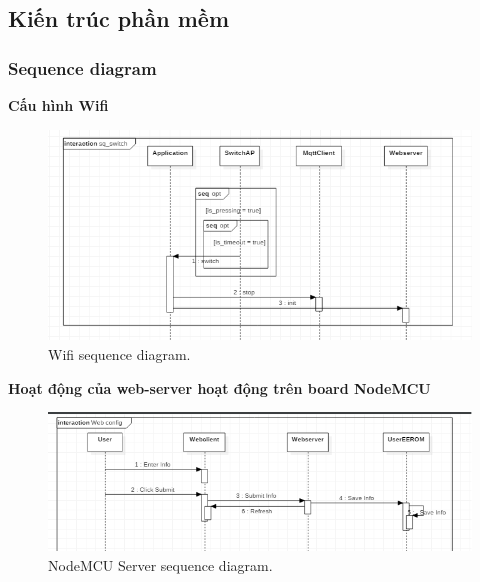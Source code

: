 \documentclass[a4paper,12pt,oneside]{article}
\begin{document}


\newpage
\subsection{Kiến trúc phần mềm}
\subsubsection{Sequence diagram}
\noindent \textbf{Cấu hình Wifi}
\begin{figure}[H]
\centering
\begin{center}
\includegraphics[scale=.9]{hinh/sq_switch_wifi.PNG}
\end{center}
\caption{Wifi sequence diagram.}
\end{figure}

\noindent \textbf{Hoạt động của web-server hoạt động trên board NodeMCU}
\begin{figure}[H]
\centering
\begin{center}
\includegraphics[scale=.8]{hinh/sq_web.PNG}
\end{center}
\caption{NodeMCU Server sequence diagram.}
\end{figure}
\end{document}
